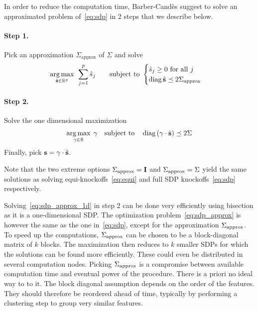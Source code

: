 In order to reduce the computation time,
Barber-Candès suggest to solve an approximated problem of~\ref{eq:sdp} in 2 steps that we describe below.
\paragraph*{Step 1.}
Pick an approximation $\Sigma_\text{approx}$ of $\Sigma$ and solve
\begin{equation}\label{eq:sdp_approx}
    \underset{\hat{\mathbf{s}} \in \mathbb{R}^p}{\operatorname*{arg\,max}}\;\,
    \sum_{j = 1}^p \hat{s}_j
    \qquad
    \text{subject to } \begin{cases}
        \hat{s}_j \geq 0\text{ for all } j\\
        \operatorname*{diag} \hat{\mathbf{s}} \preceq 2\Sigma_\text{approx}
    \end{cases}
\end{equation}
\paragraph*{Step 2.}
Solve the one dimensional maximization
\begin{equation}\label{eq:sdp_approx_1d}
    \underset{\gamma \in \mathbb{R}}{\operatorname*{arg\,max}}\;\,\gamma
    \quad\text{subject to}\quad
    \operatorname*{diag}\left( \gamma \cdot \hat{\mathbf{s}} \right) \preceq 2\Sigma
\end{equation}
Finally, pick $\mathbf{s} = \gamma \cdot \hat{\mathbf{s}}$.

\begin{remark}
    Note that the two extreme options $\Sigma_\text{approx} = \mathbf{I}$ and $\Sigma_\text{approx} = \Sigma$ yield
    the same solutions as solving equi-knockoffs~\ref{eq:equi} and full SDP knockoffs~\ref{eq:sdp} respectively.
\end{remark}

Solving~\ref{eq:sdp_approx_1d} in step 2 can be done very efficiently using bisection as it is a one-dimensional SDP\@.
The optimization problem~\ref{eq:sdp_approx} is however the same as the one in~\ref{eq:sdp},
except for the approximation $\Sigma_\text{approx}$.
To speed up the computations,
$\Sigma_\text{approx}$ can be chosen to be a block-diagonal matrix of $k$ blocks.
The maximization then reduces to $k$ smaller SDPs for which the solutions can be found more efficiently.
These could even be distributed in several computation nodes.
Picking $\Sigma_\text{approx}$ is a compromise between available computation time and eventual power of the procedure.
There is a priori no ideal way to to it.
The block diagonal assumption depends on the order of the features.
They should therefore be reordered ahead of time,
typically by performing a clustering step to group very similar features.

